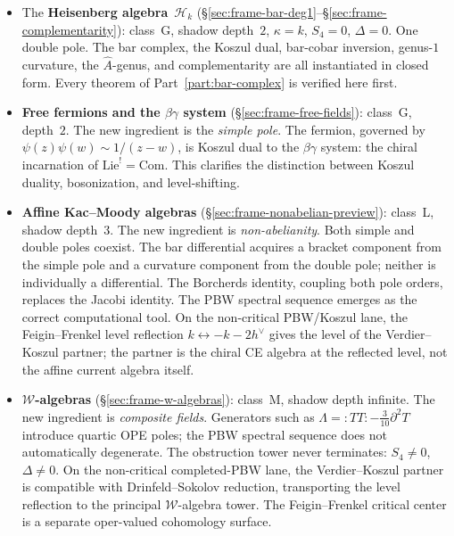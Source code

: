 \begin{itemize}
\item The \textbf{Heisenberg algebra}~$\mathcal{H}_k$
 (\S\ref{sec:frame-bar-deg1}--\S\ref{sec:frame-complementarity}):
 class~G, shadow depth~$2$, $\kappa = k$, $S_4 = 0$, $\Delta = 0$.
 One double pole. The bar complex, the Koszul dual, bar-cobar
 inversion, genus-$1$ curvature, the $\hat{A}$-genus, and
 complementarity are all instantiated in closed form. Every theorem
 of Part~\ref{part:bar-complex} is verified here first.

\item \textbf{Free fermions and the $\beta\gamma$ system}
 (\S\ref{sec:frame-free-fields}): class~G, depth~$2$. The new
 ingredient is the \emph{simple pole}. The fermion, governed by
 $\psi(z)\psi(w) \sim 1/(z-w)$, is Koszul dual to the $\beta\gamma$
 system: the chiral incarnation of $\mathrm{Lie}^! = \mathrm{Com}$.
 This clarifies the distinction between Koszul duality, bosonization,
 and level-shifting.

\item \textbf{Affine Kac--Moody algebras}
 (\S\ref{sec:frame-nonabelian-preview}): class~L, shadow depth~$3$.
 The new ingredient is \emph{non-abelianity}. Both simple and double
 poles coexist. The bar differential acquires a bracket component from
 the simple pole and a curvature component from the double pole;
 neither is individually a differential. The Borcherds identity,
 coupling both pole orders, replaces the Jacobi identity. The PBW
 spectral sequence emerges as the correct computational tool. On the
 non-critical PBW/Koszul lane, the Feigin--Frenkel level reflection
 $k \leftrightarrow -k - 2h^\vee$ gives the level of the
 Verdier--Koszul partner; the partner is the chiral CE algebra at the
 reflected level, not the affine current algebra itself.

\item \textbf{$\mathcal{W}$-algebras}
 (\S\ref{sec:frame-w-algebras}): class~M, shadow depth infinite.
 The new ingredient is \emph{composite fields}. Generators such as
 $\Lambda = :\!TT\!: - \tfrac{3}{10}\partial^2 T$ introduce quartic
 OPE poles; the PBW spectral sequence does not automatically
 degenerate. The obstruction tower never terminates: $S_4 \neq 0$,
 $\Delta \neq 0$. On the non-critical completed-PBW lane, the
 Verdier--Koszul partner is compatible with Drinfeld--Sokolov
 reduction, transporting the level reflection to the principal
 $\mathcal{W}$-algebra tower. The Feigin--Frenkel critical center is
 a separate oper-valued cohomology surface.


\end{itemize}
